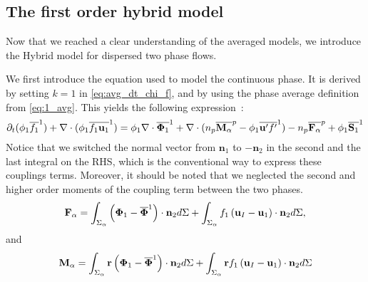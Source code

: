\subsection{The first order hybrid model}

Now that we reached a clear understanding of the averaged models, we introduce the Hybrid model for dispersed two phase flows. 

We first introduce the equation used to model the continuous phase. 
It is derived by setting $k = 1$ in \ref{eq:avg_dt_chi_f}, and by using the phase average definition from \ref{eq:1_avg}.
This yields the following expression~:
\begin{equation}
    \partial_t (\phi_1\overline{ f_1}^1)
    + \mathbf{\nabla} \cdot (\phi_1\overline{ f_1 \textbf{u}_1}^1)
    = \phi_1 \mathbf{\nabla} \cdot \overline{ \mathbf{\Phi}_1}^1
    +  \mathbf{\nabla} \cdot (n_p\overline{\textbf{M}_\alpha}^{p} - \phi_1 \overline{\textbf{u}'f'}^1)
    - n_p\overline{\textbf{F}_\alpha}^{p} 
    + \phi_1\overline{ \textbf{S}_1}^1
    \label{eq:hybrid_avg_dt_chif}
\end{equation}
Notice that we switched the normal vector from $\textbf{n}_1$ to $-\textbf{n}_2$ in the second and the last integral on the RHS, which is the conventional way to express these couplings terms. 
Moreover, it should be noted that we neglected the second and higher order moments of the coupling term between the two phases.
\begin{equation*}
    \textbf{F}_\alpha = 
    \int_{\Sigma_\alpha}
    \left(
        \mathbf{\Phi}_1 
        - \overline{\mathbf{\Phi}}^1
    \right)  
    \cdot \textbf{n}_2d\Sigma
    + 
    \int_{\Sigma_\alpha}f_1
    \left(
        \textbf{u}_I
        - \textbf{u}_1
    \right)
    \cdot \textbf{n}_2d\Sigma,
\end{equation*}
and 
\begin{equation*}
    \textbf{M}_\alpha = \int_{\Sigma_\alpha} \textbf{r}
        \left(\mathbf{\Phi}_1- \overline{\mathbf{\Phi}}^1\right)\cdot \textbf{n}_2d\Sigma
        + \int_{\Sigma_\alpha} \textbf{r}f_1
        \left(
            \textbf{u}_I
            - \textbf{u}_1
        \right)
    \cdot \textbf{n}_2d\Sigma
\end{equation*}

